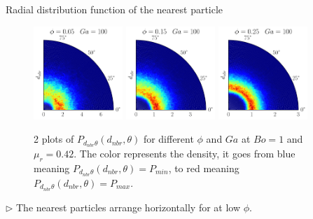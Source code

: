 \documentclass{sintefbeamer}
\begin{document}
\begin{frame}{Radial distribution function of the nearest particle}
  \begin{figure}[h!]
    \centering
    \includegraphics[width =0.3\textwidth]{image/N_10/beta/2DMAP_theta_distmin_dmin_10_Bo1PHI0_05mu_r0_42Ga100.pdf}
    \includegraphics[width =0.3\textwidth]{image/N_10/beta/2DMAP_theta_distmin_dmin_10_Bo1PHI0_15mu_r0_42Ga100.pdf}
    \includegraphics[width =0.3\textwidth]{image/N_10/beta/2DMAP_theta_distmin_dmin_10_Bo1PHI0_25mu_r0_42Ga100.pdf}
    \caption{2 plots of $P_{d_{nbr}\theta}(d_{nbr},\theta)$ for different $\phi$ and $Ga$ at $Bo = 1$ and $\mu_r = 0.42$. The color represents the density, it goes from blue meaning $P_{d_{nbr}\theta}(d_{nbr},\theta)= P_{min}$, to red meaning $P_{d_{nbr}\theta}(d_{nbr},\theta) = P_{max}$.} 
\end{figure} 
$\triangleright$ The nearest particles arrange horizontally for at low $\phi$.
\end{frame}
\end{document}
